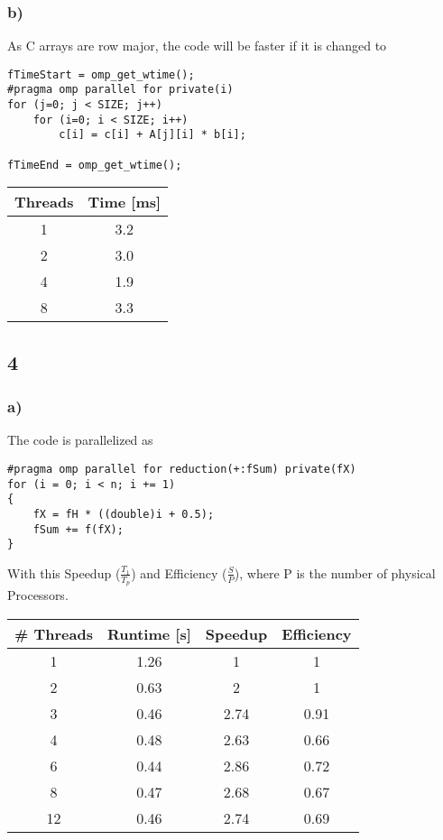 \documentclass{article}
\begin{document}
\subsubsection{b)}
As C arrays are row major, the code will be faster if it is changed to 
\begin{lstlisting}
fTimeStart = omp_get_wtime();
#pragma omp parallel for private(i)
for (j=0; j < SIZE; j++)
	for (i=0; i < SIZE; i++)
		c[i] = c[i] + A[j][i] * b[i];

fTimeEnd = omp_get_wtime();
\end{lstlisting}
\begin{center}
\begin{tabular}{c|c}
	Threads&Time [ms] \\ \hline
	1&3.2 \\ \hline
	2&3.0 \\ \hline
	4&1.9 \\ \hline
	8&3.3 \\ \hline
\end{tabular}
\end{center}

\subsection{4}
\subsubsection{a)}
The code is parallelized as
\begin{lstlisting}
#pragma omp parallel for reduction(+:fSum) private(fX)
for (i = 0; i < n; i += 1)
{
	fX = fH * ((double)i + 0.5);
	fSum += f(fX);
}
\end{lstlisting}
With this Speedup ($\frac{T_1}{T_p}$) and Efficiency ($\frac{S}{P}$), where P is the number of physical Processors.
\begin{center}
	\begin{tabular}{c|c|c|c}
		\# Threads&Runtime [s]&Speedup&Efficiency \\ \hline
		1&1.26&1&1\\ \hline
		2&0.63&2&1\\ \hline
		3&0.46&2.74&0.91\\ \hline
		4&0.48&2.63&0.66\\ \hline
		6&0.44&2.86&0.72\\ \hline
		8&0.47&2.68&0.67\\ \hline
		12&0.46&2.74&0.69
	\end{tabular}
\end{center}
\end{document}
